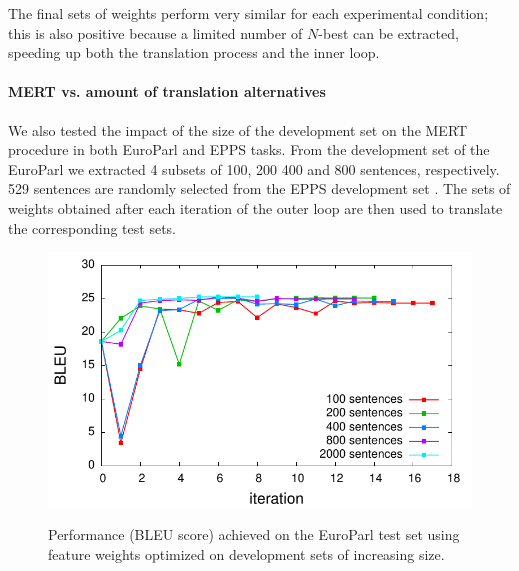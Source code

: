 \documentclass[10pt]{report}
\theoremstyle{plain}
\begin{document}
{The final sets of weights perform very similar for each experimental condition; this is also positive because a limited number of $N$-best can be extracted, speeding up both the translation process and the inner loop.


\paragraph{MERT vs. amount of translation alternatives}
We also tested the impact of the size of the development set on the MERT procedure in both EuroParl and EPPS tasks. 
From the  development set of the EuroParl we extracted 4 subsets of 100, 200 400 and 800 sentences, respectively. 529 sentences are randomly selected from the EPPS development set .
The sets of weights obtained after each iteration of the outer loop are then used to translate the corresponding test sets.

\begin{figure}
\begin{center}
\label{fig:MERT-europarl-devsize}
 \includegraphics[width=\columnwidth]{europarl-devsize}
\caption{Performance (BLEU score) achieved on the EuroParl test set using feature weights optimized on  development sets of increasing size.}
\end{center}
 \end{figure}


}
\end{document}
